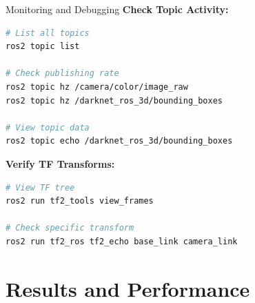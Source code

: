 \documentclass[aspectratio=169]{beamer}
\begin{document}
\begin{frame}[fragile]{Monitoring and Debugging}
\textbf{Check Topic Activity:}
\begin{lstlisting}[language=bash]
# List all topics
ros2 topic list

# Check publishing rate
ros2 topic hz /camera/color/image_raw
ros2 topic hz /darknet_ros_3d/bounding_boxes

# View topic data
ros2 topic echo /darknet_ros_3d/bounding_boxes
\end{lstlisting}

\vspace{1em}
\textbf{Verify TF Transforms:}
\begin{lstlisting}[language=bash]
# View TF tree
ros2 run tf2_tools view_frames

# Check specific transform
ros2 run tf2_ros tf2_echo base_link camera_link
\end{lstlisting}
\end{frame}

\section{Results and Performance}
\end{document}
